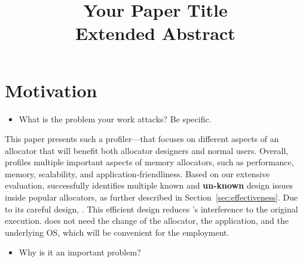 \documentclass[pageno]{jpaper}
\begin{document}
\title{Your Paper Title \\ \textbf{Extended Abstract}}

\date{}

\maketitle

\thispagestyle{empty}



\section{Motivation}
\label{sec:motivation}


\begin{itemize}
\item What is the problem your work attacks? Be specific.
\end{itemize}

\noindent
This paper presents such a profiler--\MP{}--that focuses on different aspects of an allocator that will benefit both allocator designers and normal users. Overall, \MP{} profiles multiple important aspects of memory allocators, such as performance, memory, scalability, and application-friendliness. Based on our extensive evaluation, \MP{} successfully identifies multiple known and \textbf{un-known} design issues inside popular allocators, as further described in Section~\ref{sec:effectiveness}. Due to its careful design, . This efficient design reduces \MP{}'s interference to the original execution. \MP{} does not need the change of the allocator, the application, and the underlying OS, which will be convenient for the employment. 

\begin{itemize}
\item Why is it an important problem?
\end{itemize}
\end{document}
